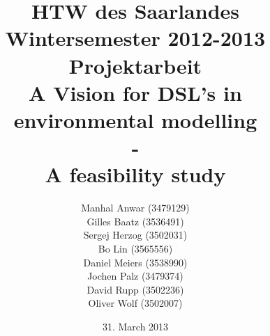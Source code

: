 


\title{%
\large HTW des Saarlandes\\
Wintersemester 2012-2013\\
Projektarbeit\\[10mm]
{\LARGE A Vision for DSL's in environmental modelling}\\
{\LARGE -}\\
{\LARGE A feasibility study}\\[10mm]
}

\author{%
Manhal Anwar (3479129)\\[1mm]
Gilles Baatz (3536491)\\[1mm]
Sergej Herzog (3502031)\\[1mm]
Bo Lin (3565556)\\[1mm]
Daniel Meiers (3538990)\\[1mm]
Jochen Palz (3479374)\\[1mm]
David Rupp (3502236)\\[1mm]
Oliver Wolf (3502007)\\[1mm]
}

\date{31. March 2013}



\maketitle

\tableofcontents
\listoffigures


 













\printbibliography


